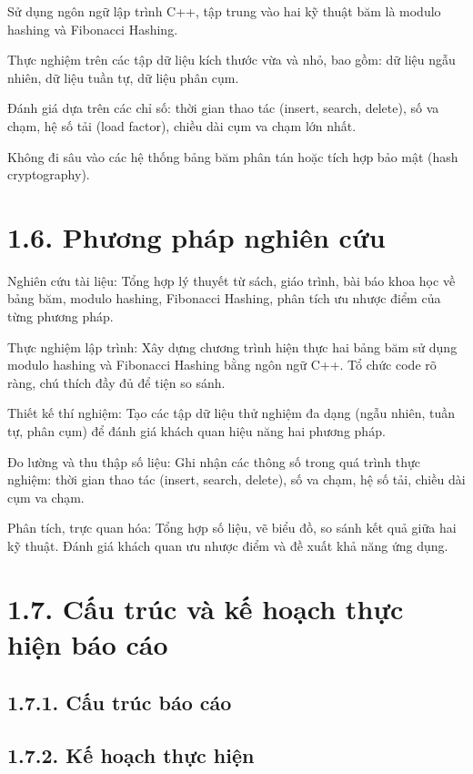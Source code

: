 \documentclass[12pt,a4paper]{report}
\begin{document}
Sử dụng ngôn ngữ lập trình C++, tập trung vào hai kỹ thuật băm là modulo hashing và Fibonacci Hashing.

Thực nghiệm trên các tập dữ liệu kích thước vừa và nhỏ, bao gồm: dữ liệu ngẫu nhiên, dữ liệu tuần tự, dữ liệu phân cụm.

Đánh giá dựa trên các chỉ số: thời gian thao tác (insert, search, delete), số va chạm, hệ số tải (load factor), chiều dài cụm va chạm lớn nhất.

Không đi sâu vào các hệ thống bảng băm phân tán hoặc tích hợp bảo mật (hash cryptography).

\section*{1.6. Phương pháp nghiên cứu}

\noindent \indent Nghiên cứu tài liệu:
Tổng hợp lý thuyết từ sách, giáo trình, bài báo khoa học về bảng băm, modulo hashing, Fibonacci Hashing, phân tích ưu nhược điểm của từng phương pháp.

Thực nghiệm lập trình:
Xây dựng chương trình hiện thực hai bảng băm sử dụng modulo hashing và Fibonacci Hashing bằng ngôn ngữ C++. Tổ chức code rõ ràng, chú thích đầy đủ để tiện so sánh.

Thiết kế thí nghiệm:
Tạo các tập dữ liệu thử nghiệm đa dạng (ngẫu nhiên, tuần tự, phân cụm) để đánh giá khách quan hiệu năng hai phương pháp.

Đo lường và thu thập số liệu:
Ghi nhận các thông số trong quá trình thực nghiệm: thời gian thao tác (insert, search, delete), số va chạm, hệ số tải, chiều dài cụm va chạm.

Phân tích, trực quan hóa:
Tổng hợp số liệu, vẽ biểu đồ, so sánh kết quả giữa hai kỹ thuật. Đánh giá khách quan ưu nhược điểm và đề xuất khả năng ứng dụng.

    \noindent \indent

\section*{1.7. Cấu trúc và kế hoạch thực hiện báo cáo}
\subsection*{1.7.1. Cấu trúc báo cáo}
\noindent \indent

\subsection*{1.7.2. Kế hoạch thực hiện}
\noindent \indent 
\end{document}
